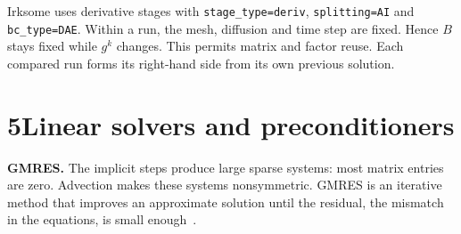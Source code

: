 \documentclass[11pt,a4paper]{article}
\newcommand{\code}[1]{\texttt{#1}}
\begin{document}
Irksome uses derivative stages with \code{stage\_type=deriv}, \code{splitting=AI} and \code{bc\_type=DAE}. Within a run, the mesh, diffusion and time step are fixed. Hence $B$ stays fixed while $g^k$ changes. This permits matrix and factor reuse. Each compared run forms its right-hand side from its own previous solution.

\newpage
\section*{5\quad Linear solvers and preconditioners}
\textbf{GMRES.} The implicit steps produce large sparse systems: most matrix entries are zero. Advection makes these systems nonsymmetric. GMRES is an iterative method that improves an approximate solution until the residual, the mismatch in the equations, is small enough~\cite{petscgmres}.
\end{document}
